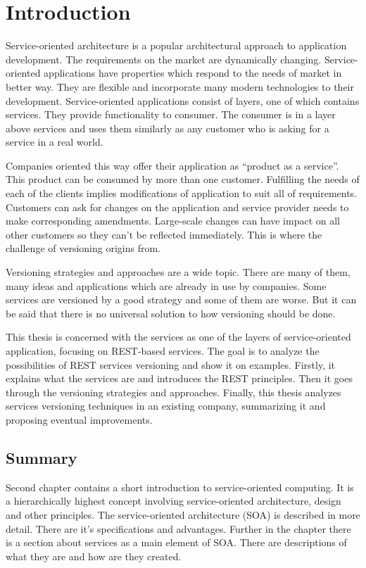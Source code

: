 \chapter{Introduction}
\label{chap:introduction}

Service-oriented architecture is a popular architectural approach to application development. The requirements on the market are dynamically changing. Service-oriented applications have properties which respond to the needs of market in better way. They are flexible and incorporate many modern technologies to their development. Service-oriented applications consist of layers, one of which contains services. They provide functionality to consumer. The consumer is in a layer above services and uses them similarly as any customer who is asking for a service in a real world.

Companies oriented this way offer their application as “product as a service”. This product can be consumed by more than one customer. Fulfilling the needs of each of the clients implies modifications of application to suit all of requirements. Customers can ask for changes on the application and service provider needs to make corresponding amendments. Large-scale changes can have impact on all other customers so they can’t be reflected immediately. This is where the challenge of versioning origins from. 

Versioning strategies and approaches are a wide topic. There are many of them, many ideas and applications which are already in use by companies. Some services are versioned by a good strategy and some of them are worse. But it can be said that there is no universal solution to how versioning should be done. 

This thesis is concerned with the services as one of the layers of service-oriented application, focusing on REST-based services. The goal is to analyze the possibilities of REST services versioning and show it on examples. Firstly, it explains what the services are and introduces the REST principles. Then it goes through the versioning strategies and approaches. Finally, this thesis analyzes services versioning techniques in an existing company, summarizing it and proposing eventual improvements.

\section{Summary}

Second chapter contains a short introduction to service-oriented computing. It is a hierarchically highest concept involving service-oriented architecture, design and other principles. The service-oriented architecture (SOA) is described in more detail. There are it’s specifications and advantages. Further in the chapter there is a section about services as a main element of SOA. There are descriptions of what they are and how are they created.

